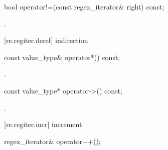 %
%
\begin{itemdecl}
bool operator!=(const regex_iterator& right) const;
\end{itemdecl}

\begin{itemdescr}
\pnum\returns {}.
\end{itemdescr}

[re.regiter.deref]{ indirection}

%
%
\begin{itemdecl}
const value_type& operator*() const;
\end{itemdecl}

\begin{itemdescr}
\pnum\returns  {}.
\end{itemdescr}

%
%
\begin{itemdecl}
const value_type* operator->() const;
\end{itemdecl}

\begin{itemdescr}
\pnum\returns  {}.
\end{itemdescr}

[re.regiter.incr]{ increment}

%
%
%
\begin{itemdecl}
regex_iterator& operator++(); 
\end{itemdecl}

